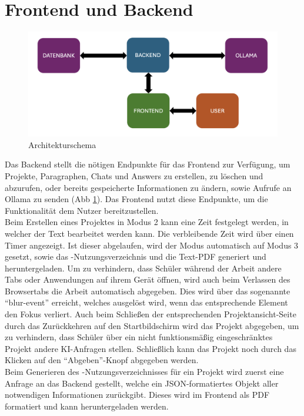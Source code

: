 \documentclass[../main.tex]{subfiles}
\begin{document}
\section{Frontend und Backend}
\begin{figure}[h!]
  \includegraphics[scale=0.6]{bilder/Architektur.png}
  \caption{Architekturschema}
  \label{fig:architecture}
\end{figure}
Das Backend stellt die nötigen Endpunkte für das Frontend zur Verfügung, um Projekte, Paragraphen, Chats und Answers zu erstellen, zu löschen und abzurufen, oder bereits gespeicherte 
Informationen zu ändern, sowie Aufrufe an Ollama zu senden (Abb \ref{fig:architecture}). Das Frontend nutzt diese Endpunkte, um die Funktionalität dem Nutzer bereitzustellen.\\

Beim Erstellen eines Projektes in Modus 2 kann eine Zeit festgelegt werden, in welcher der Text bearbeitet werden kann. Die verbleibende Zeit wird über einen Timer angezeigt. Ist 
dieser abgelaufen, wird der Modus automatisch auf Modus 3 gesetzt, sowie das -Nutzungsverzeichnis und die Text-PDF generiert und heruntergeladen. Um zu verhindern, dass Schüler 
während der Arbeit andere Tabs oder Anwendungen auf ihrem Gerät öffnen, wird auch beim Verlassen des Browsertabs die Arbeit automatisch abgegeben. Dies wird über das sogenannte 
"`blur-event"' erreicht, welches ausgelöst wird, wenn das entsprechende Element den Fokus verliert\cite{react-onblur}. Auch beim Schließen der entsprechenden Projektansicht-Seite durch das Zurückkehren 
auf den Startbildschirm wird das Projekt abgegeben, um zu verhindern, dass Schüler über ein nicht funktionsmäßig eingeschränktes Projekt andere KI-Anfragen stellen. Schließlich kann 
das Projekt noch durch das Klicken auf den "`Abgeben"'-Knopf abgegeben werden.\\
Beim Generieren des -Nutzungsverzeichnisses für ein Projekt wird zuerst eine Anfrage an das Backend gestellt, welche ein JSON-formatiertes Objekt aller 
notwendigen Informationen zurückgibt. Dieses wird im Frontend als PDF formatiert und kann heruntergeladen werden.
\end{document}
